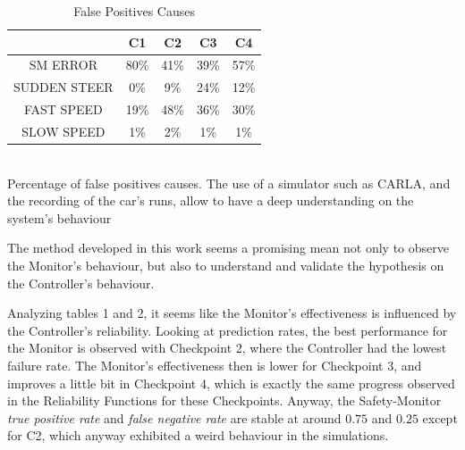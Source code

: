 \begin{table}
	\caption{False Positives Causes}
	\begin{center}
		\begin{tabular}{ |c|c|c|c|c| }
			\hline
			  & C1 & C2 & C3 & C4 \\
			\hline
			SM ERROR & 80\% & 41\% & 39\% & 57\% \\
			\hline
			SUDDEN STEER & 0\% & 9\% & 24\% & 12\% \\
			\hline
			FAST SPEED & 19\% & 48\% & 36\% & 30\% \\
			\hline
			SLOW SPEED & 1\% & 2\% & 1\% & 1\% \\
			\hline
		\end{tabular}
	\\
	\vspace{0.3cm}
	Percentage of false positives causes. The use of a simulator such as CARLA, and the recording of the car's runs, allow to have a deep understanding on the system's behaviour
	\end{center}
\end{table}

The method developed in this work seems a promising mean not only to observe the Monitor's behaviour, but also to understand and validate the hypothesis on the Controller's behaviour.

Analyzing tables 1 and 2, it seems like the Monitor's effectiveness is influenced by the Controller's reliability. Looking at prediction rates, the best performance for the Monitor is observed with Checkpoint 2, where the Controller had the lowest failure rate. The Monitor's effectiveness then is lower for Checkpoint 3, and improves a little bit in Checkpoint 4, which is exactly the same progress observed in the Reliability Functions for these Checkpoints. Anyway, the Safety-Monitor \textsl{true positive rate} and \textsl{false negative rate} are stable at around $0.75$ and $0.25$ except for C2, which anyway exhibited a weird behaviour in the simulations.

